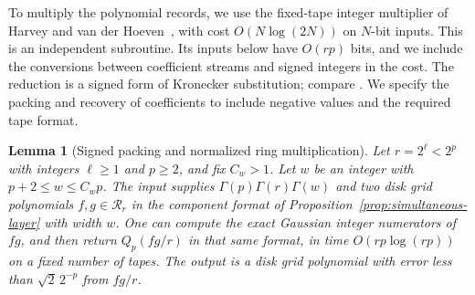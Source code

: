 \documentclass[11pt]{article}
\newtheorem{lemma}[theorem]{Lemma}
\theoremstyle{definition}
\begin{document}
To multiply the polynomial records, we use the fixed-tape integer
multiplier of Harvey and van der
Hoeven~\cite[Theorem~1.1]{HarveyHoeven2021}, with cost
$O(N\log(2N))$ on $N$-bit inputs.  This is an independent subroutine.
Its inputs below have $O(rp)$ bits, and we include the conversions
between coefficient streams and signed integers in the cost. The
reduction is a signed form of Kronecker substitution; compare
\cite[Lemma~2.5]{HarveyHoeven2021}. We specify the packing and recovery
of coefficients to include negative values and the required tape format.

\begin{lemma}[Signed packing and normalized ring multiplication]
\label{lem:signed-ring-product}
Let $r=2^\ell<2^p$ with integers $\ell\geq1$ and $p\geq2$, and fix $C_w>1$.
Let $w$ be an integer with $p+2\leq w\leq C_wp$.
The input supplies $\Gamma(p)\Gamma(r)\Gamma(w)$ and two disk grid
polynomials $f,g\in\mathcal R_r$ in the component format of
Proposition~\ref{prop:simultaneous-layer} with width $w$.
One can compute the exact Gaussian integer
numerators of $fg$, and then return $Q_p(fg/r)$ in that same format, in time
$O(rp\log(rp))$ on a fixed number of tapes.  The output is a disk
grid polynomial with error less than $\sqrt2\,2^{-p}$ from $fg/r$.
\end{lemma}
\end{document}
